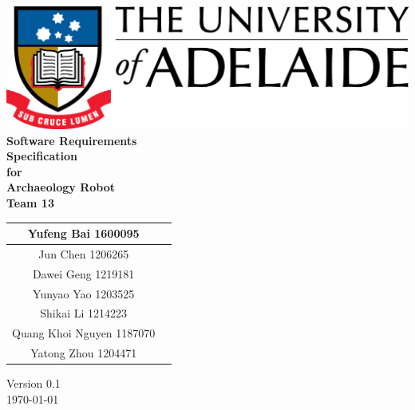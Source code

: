 \begin{center}
\includegraphics[scale=1.5]{./UniLogo}\\[1cm]    
\textbf{\Huge \bfseries Software Requirements \\Specification}\\[1.5cm]
\textbf{\huge for}\\[0.5cm]


\textbf{ \huge Archaeology Robot }\\[0.3cm]
\textbf{ \huge Team 13 }\\[2cm]


\begin{tabular}{ |c | p{2cm} |}
	\hline
Yufeng Bai 1600095 & \\[.5cm] \hline
Jun Chen 1206265 & \\[.5cm] \hline
Dawei Geng 1219181 & \\[.5cm] \hline
Yunyao Yao 1203525 & \\[.5cm] \hline
Shikai Li 1214223 & \\[.5cm] \hline
Quang Khoi Nguyen 1187070  & \\[.5cm] \hline
Yatong Zhou 1204471 & \\[.5cm] \hline
\end{tabular}


\vfill

Version 0.1 \\ [0.2cm]
{\large \today}

\end{center}


